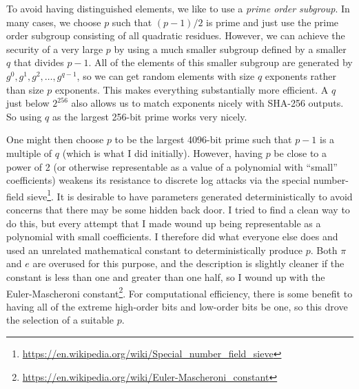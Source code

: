To avoid having distinguished elements, we like to use a {\em prime order
subgroup}. In many cases, we choose $p$ such that $(p-1)/2$ is prime and
just use the prime order subgroup consisting of all quadratic
residues. However, we can achieve the security of a very large $p$ by
using a much smaller subgroup defined by a smaller $q$ that divides
$p-1$. All of the elements of this smaller subgroup are generated by
$g^0,g^1, g^2,\ldots, g^{q-1}$, so we can get random elements with size $q$
exponents rather than size $p$ exponents. This makes everything
substantially more efficient. A $q$ just below $2^{256}$ also allows us to
match exponents nicely with SHA-256 outputs. So using $q$ as the largest
256-bit prime works very nicely.
 

One might then choose $p$ to be the largest 4096-bit prime such that
$p-1$ is a multiple of $q$ (which is what I did initially).  However,
having $p$ be close to a power of 2 (or otherwise representable as a
value of a polynomial with ``small'' coefficients) weakens its
resistance to discrete log attacks via the special number-field
sieve\footnote{\url{https://en.wikipedia.org/wiki/Special_number_field_sieve}}.
It is desirable to have parameters generated deterministically to
avoid concerns that there may be some hidden back door.  I tried to
find a clean way to do this, but every attempt that I made wound up
being representable as a polynomial with small coefficients.  I
therefore did what everyone else does and used an unrelated
mathematical constant to deterministically produce $p$.  Both $\pi$
and $e$ are overused for this purpose, and the description is slightly cleaner
if the constant is less than one and greater than one half, so I wound
up with the Euler-Mascheroni
constant\footnote{\url{https://en.wikipedia.org/wiki/Euler-Mascheroni_constant}}.
For computational efficiency,
there is some benefit to having all of the extreme high-order bits and
low-order bits be one, so this drove the selection of a suitable $p$.


